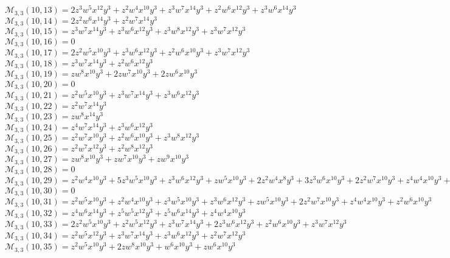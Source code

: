 $\mathcal{M}_{3,3}(10,13)=2z^3w^5x^{12}y^3+z^2w^4x^{10}y^3+z^3w^7x^{14}y^3+z^2w^6x^{12}y^3+z^3w^6x^{14}y^3$\\
$\mathcal{M}_{3,3}(10,14)=2z^2w^6x^{14}y^3+z^2w^7x^{14}y^3$\\
$\mathcal{M}_{3,3}(10,15)=z^3w^7x^{14}y^3+z^3w^6x^{12}y^3+z^3w^8x^{12}y^3+z^3w^7x^{12}y^3$\\
$\mathcal{M}_{3,3}(10,16)=0$\\
$\mathcal{M}_{3,3}(10,17)=2z^2w^5x^{10}y^3+z^3w^6x^{12}y^3+z^2w^6x^{10}y^3+z^3w^7x^{12}y^3$\\
$\mathcal{M}_{3,3}(10,18)=z^3w^7x^{14}y^3+z^2w^6x^{12}y^3$\\
$\mathcal{M}_{3,3}(10,19)=zw^8x^{10}y^3+2zw^7x^{10}y^3+2zw^6x^{10}y^3$\\
$\mathcal{M}_{3,3}(10,20)=0$\\
$\mathcal{M}_{3,3}(10,21)=z^2w^5x^{10}y^3+z^3w^7x^{14}y^3+z^3w^6x^{12}y^3$\\
$\mathcal{M}_{3,3}(10,22)=z^2w^7x^{14}y^3$\\
$\mathcal{M}_{3,3}(10,23)=zw^8x^{14}y^3$\\
$\mathcal{M}_{3,3}(10,24)=z^4w^7x^{14}y^3+z^3w^6x^{12}y^3$\\
$\mathcal{M}_{3,3}(10,25)=z^2w^7x^{10}y^3+z^2w^6x^{10}y^3+z^3w^8x^{12}y^3$\\
$\mathcal{M}_{3,3}(10,26)=z^2w^7x^{12}y^3+z^2w^8x^{12}y^3$\\
$\mathcal{M}_{3,3}(10,27)=zw^8x^{10}y^3+zw^7x^{10}y^3+zw^9x^{10}y^3$\\
$\mathcal{M}_{3,3}(10,28)=0$\\
$\mathcal{M}_{3,3}(10,29)=z^2w^4x^{10}y^3+5z^3w^5x^{10}y^3+z^3w^6x^{12}y^3+zw^5x^{10}y^3+2z^2w^4x^8y^3+3z^3w^6x^{10}y^3+2z^2w^7x^{10}y^3+z^4w^4x^{10}y^3+z^2w^5x^8y^3$\\
$\mathcal{M}_{3,3}(10,30)=0$\\
$\mathcal{M}_{3,3}(10,31)=z^2w^5x^{10}y^3+z^2w^4x^{10}y^3+z^3w^5x^{10}y^3+z^3w^6x^{12}y^3+zw^5x^{10}y^3+2z^2w^7x^{10}y^3+z^4w^4x^{10}y^3+z^2w^6x^{10}y^3$\\
$\mathcal{M}_{3,3}(10,32)=z^4w^6x^{14}y^3+z^5w^5x^{12}y^3+z^5w^6x^{14}y^3+z^4w^4x^{10}y^3$\\
$\mathcal{M}_{3,3}(10,33)=2z^2w^5x^{10}y^3+z^2w^5x^{12}y^3+z^3w^7x^{14}y^3+2z^3w^6x^{12}y^3+z^2w^6x^{10}y^3+z^3w^7x^{12}y^3$\\
$\mathcal{M}_{3,3}(10,34)=z^2w^5x^{12}y^3+z^3w^7x^{14}y^3+z^3w^6x^{12}y^3+z^2w^7x^{12}y^3$\\
$\mathcal{M}_{3,3}(10,35)=z^2w^5x^{10}y^3+2zw^8x^{10}y^3+w^6x^{10}y^3+zw^6x^{10}y^3$\\
